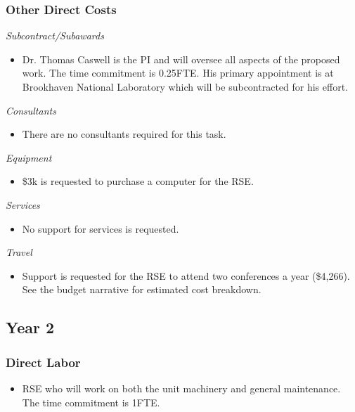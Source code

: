 \documentclass[12pt]{article}
\numberwithin{page}{section}
\begin{document}
\subsubsection{Other Direct Costs}
\textit{Subcontract/Subawards}
\begin{itemize}
\item Dr. Thomas Caswell is the PI and will oversee all aspects of the
  proposed work.  The time commitment is 0.25FTE.  His primary
  appointment is at Brookhaven National Laboratory which will be
  subcontracted for his effort.
\end{itemize}
\textit{Consultants}
\begin{itemize}
\item There are no consultants required for this task.
\end{itemize}
\textit{Equipment}
\begin{itemize}
\item \$3k is requested to purchase a computer for the RSE.
\end{itemize}
\textit{Services}
\begin{itemize}
\item No support for services is requested.
\end{itemize}
\textit{Travel}
\begin{itemize}
\item Support is requested for the RSE to attend two conferences a
  year (\$4,266).  See the budget narrative for estimated cost
  breakdown.
\end{itemize}
\subsection{Year 2}
\subsubsection{Direct Labor}
\begin{itemize}
\item RSE who will work on both the unit machinery and general
  maintenance.  The time commitment is 1FTE.
\end{itemize}
\end{document}
